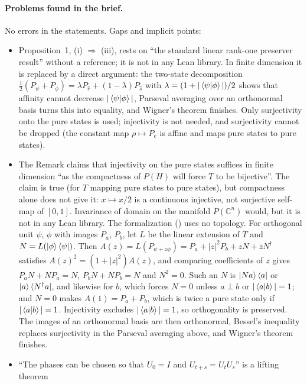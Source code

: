 \documentclass[11pt]{article}
\begin{document}
\paragraph{Problems found in the brief.} No errors in the statements. Gaps and implicit points:
\begin{itemize}
\item Proposition~1, (i) $\Rightarrow$ (iii), rests on ``the standard linear rank-one preserver
  result'' without a reference; it is not in any Lean library. In finite dimension it is
  replaced by a direct argument: the two-state decomposition
  $\tfrac12(P_\psi + P_\phi) = \lambda P_{\hat r} + (1-\lambda)P_{\hat s}$ with
  $\lambda = (1 + |\braket{\psi|\phi}|)/2$ shows that affinity cannot decrease
  $|\braket{\psi|\phi}|$, Parseval averaging over an orthonormal basis turns this into equality,
  and Wigner's theorem finishes. Only surjectivity onto the pure states is used; injectivity is
  not needed, and surjectivity cannot be dropped (the constant map $\rho \mapsto P_e$ is affine
  and maps pure states to pure states).
\item The Remark claims that injectivity on the pure states suffices in finite dimension ``as the
  compactness of $P(H)$ will force $T$ to be bijective''. The claim is true (for $T$ mapping pure
  states to pure states), but compactness alone does not give it: $x \mapsto x/2$ is a continuous
  injective, not surjective self-map of $[0,1]$. Invariance of domain on the manifold
  $P(\mathbb{C}^n)$ would, but it is not in any Lean library. The formalization
  () uses no topology. For orthogonal unit $\psi$, $\phi$ with images
  $P_a$, $P_b$, let $L$ be the linear extension of $T$ and $N = L(\ket{\phi}\bra{\psi})$. Then
  $A(z) = L(P_{\psi + z\phi}) = P_a + |z|^2P_b + zN + \bar z N^\dagger$ satisfies
  $A(z)^2 = (1 + |z|^2)A(z)$, and comparing coefficients of $z$ gives $P_aN + NP_a = N$,
  $P_bN + NP_b = N$ and $N^2 = 0$. Such an $N$ is $\ket{Na}\bra{a}$ or $\ket{a}\bra{N^\dagger a}$,
  and likewise for $b$, which forces $N = 0$ unless $a \perp b$ or $|\braket{a|b}| = 1$; and
  $N = 0$ makes $A(1) = P_a + P_b$, which is twice a pure state only if $|\braket{a|b}| = 1$.
  Injectivity excludes $|\braket{a|b}| = 1$, so orthogonality is preserved. The images of an
  orthonormal basis are then orthonormal, Bessel's inequality replaces surjectivity in the
  Parseval averaging above, and Wigner's theorem finishes.
\item ``The phases can be chosen so that $U_0 = I$ and $U_{t+s} = U_tU_s$'' is a lifting theorem

\end{itemize}
\end{document}

